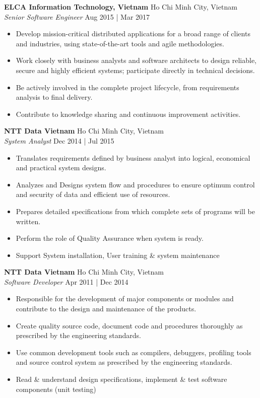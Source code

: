 \documentclass[a4paper]{article}
\begin{document}
\textbf{ELCA Information Technology, Vietnam} \hfill Ho Chi Minh City, Vietnam\\
\textit{Senior Software Engineer} \hfill Aug 2015 | Mar 2017\\
\vspace{-1mm}
\begin{itemize} \itemsep 1pt
	\item Develop mission-critical distributed applications for a broad range of clients and industries, using state-of-the-art tools and agile methodologies.
	\item Work closely with business analysts and software architects to design reliable, secure and highly efficient systems; participate directly in technical decisions.
	\item Be actively involved in the complete project lifecycle, from requirements analysis to final delivery.
	\item Contribute to knowledge sharing and continuous improvement activities.
\end{itemize}
\textbf{NTT Data Vietnam} \hfill Ho Chi Minh City, Vietnam\\
\textit{System Analyst} \hfill Dec 2014 | Jul 2015\\
\vspace{-1mm}
\begin{itemize} \itemsep 1pt
	\item Translates requirements defined by business analyst into logical, economical and practical system designs.
	\item Analyzes and Designs system flow and procedures to ensure optimum control and security of data and efficient use of resources.
	\item Prepares detailed specifications from which complete sets of programs will be written.
	\item Perform the role of Quality Assurance when system is ready.
	\item Support System installation, User training \& system maintenance
\end{itemize}
\textbf{NTT Data Vietnam} \hfill Ho Chi Minh City, Vietnam\\
\textit{Software Developer} \hfill Apr 2011 | Dec 2014\\
\vspace{-1mm}
\begin{itemize} \itemsep 1pt
	\item Responsible for the development of major components or modules and contribute to the design and maintenance of the products.
	\item Create quality source code, document code and procedures thoroughly as prescribed by the engineering standards.
	\item Use common development tools such as compilers, debuggers, profiling tools and source control system as prescribed by the engineering standards.
	\item Read \& understand design specifications, implement \& test software components (unit testing)
\end{itemize}
\end{document}
